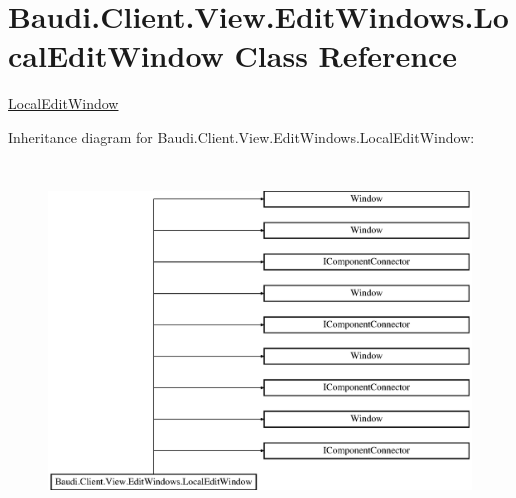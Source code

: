 \hypertarget{class_baudi_1_1_client_1_1_view_1_1_edit_windows_1_1_local_edit_window}{}\section{Baudi.\+Client.\+View.\+Edit\+Windows.\+Local\+Edit\+Window Class Reference}
\label{class_baudi_1_1_client_1_1_view_1_1_edit_windows_1_1_local_edit_window}


\hyperlink{class_baudi_1_1_client_1_1_view_1_1_edit_windows_1_1_local_edit_window}{Local\+Edit\+Window}  


Inheritance diagram for Baudi.\+Client.\+View.\+Edit\+Windows.\+Local\+Edit\+Window\+:\begin{figure}[H]
\begin{center}
\leavevmode
\includegraphics[height=9.491526cm]{class_baudi_1_1_client_1_1_view_1_1_edit_windows_1_1_local_edit_window}
\end{center}
\end{figure}
